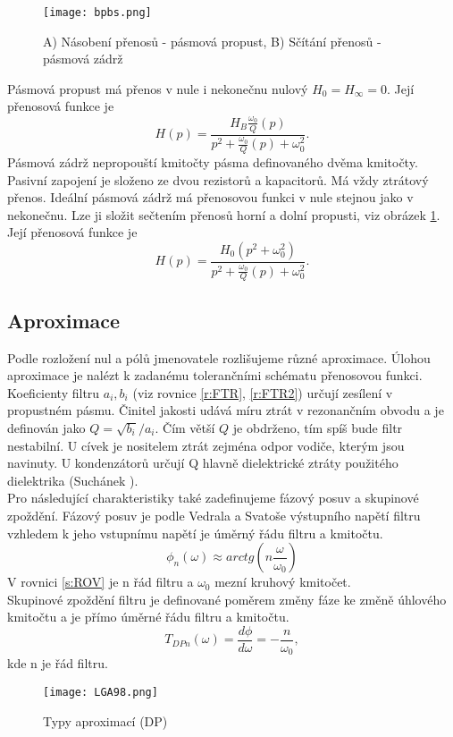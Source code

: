 \begin{figure}[h]
\centering
\texttt{[image: bpbs.png]}
\caption[A) Násobení přenosů - pásmová propust, B) Sčítání přenosů - pásmová zádrž]{A) Násobení přenosů - pásmová propust, B) Sčítání přenosů - pásmová zádrž \cite{8} \label{s:BPBS}}
\end{figure}
\noindent Pásmová propust má přenos v nule i nekonečnu nulový $H_{0} = H_{\infty} = 0$. Její přenosová funkce je~\cite{12}
\begin{equation}
H(p) = \frac{H_{B} \frac{\omega _0}{Q} (p) }{p^2 + \frac{\omega _0}{Q}(p) + \omega _0 ^2}.
\end{equation}
Pásmová zádrž nepropouští kmitočty pásma definovaného dvěma kmitočty. Pasivní zapojení je složeno ze dvou rezistorů a kapacitorů. Má vždy ztrátový přenos. Ideální pásmová zádrž má přenosovou funkci v nule stejnou jako v nekonečnu. Lze ji složit sečtením přenosů horní a dolní propusti, viz obrázek \ref{s:BPBS}. Její přenosová funkce je~\cite{12}
\begin{equation}
H(p) = \frac{H_{0} (p^2 + \omega_0^2)}{p^2 + \frac{\omega _0}{Q}(p) + \omega _0 ^2}.
\end{equation}
\subsection{Aproximace}
Podle rozložení nul a pólů jmenovatele rozlišujeme různé aproximace. Úlohou aproximace je nalézt k zadanému tolerančními schématu přenosovou funkci. Koeficienty filtru $a_i, b_i$ (viz rovnice \ref{r:FTR}, \ref{r:FTR2}) určují zesílení v propustném pásmu. Činitel jakosti udává míru ztrát v rezonančním obvodu a je definován jako $Q = \sqrt{b_i}/a_i$. Čím větší $Q$ je obdrženo, tím spíš bude filtr nestabilní. U cívek je nositelem ztrát zejména odpor vodiče, kterým jsou navinuty. U kondenzátorů určují Q hlavně dielektrické ztráty použitého dielektrika (Suchánek \cite{6}).\\
Pro následující charakteristiky také zadefinujeme fázový posuv a skupinové zpoždění. Fázový posuv je podle Vedrala a Svatoše \cite{19} výstupního napětí filtru vzhledem k jeho vstupnímu napětí je úměrný řádu filtru a kmitočtu.
\begin{equation}
\phi _n(\omega) \approx arctg(n \frac{\omega}{\omega _0}) \label{s:ROV}
\end{equation}
V rovnici \ref{s:ROV} je n řád filtru a $\omega _0$ mezní kruhový kmitočet.\\
Skupinové zpoždění filtru je definované poměrem změny fáze ke změně úhlového kmitočtu a je přímo úměrné řádu filtru a kmitočtu.\\
\begin{equation}
T _{DPn}(\omega) = \frac{d\phi}{d\omega} = - \frac{n}{\omega _0},
\end{equation}
\noindent kde n je řád filtru.\\
\begin{figure}[h]
\centering
\texttt{[image: LGA98.png]}
\caption[Typy aproximací (DP)]{Typy aproximací (DP)\cite{9}}
\end{figure}
